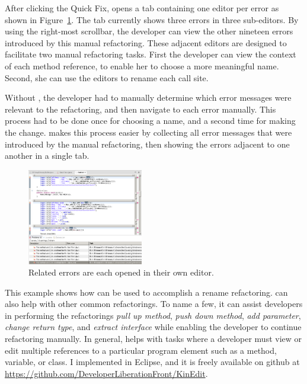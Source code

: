 \documentclass{sigplanconf}
\begin{document}
After clicking the Quick Fix, \pname{} opens a tab containing one editor
per error as shown in Figure~\ref{mult}. The tab currently shows three
errors in three sub-editors. By using the right-most scrollbar, the developer
can view the other nineteen errors introduced by this manual refactoring.
These adjacent editors are designed to facilitate two manual refactoring tasks.
First the developer can view the context of each method reference, to enable
her to choose a more meaningful name. Second, she can use
the editors to rename each call site.

Without \pname{}, the developer had to
manually determine which error messages were relevant to the refactoring, and
then navigate to each error manually. This process had to be done once for
choosing a name, and a second time for making the change. \pname{} makes this
process
easier by collecting all error messages that were introduced by
the manual refactoring, then showing the errors adjacent to one another in a
single tab.

\begin{figure}[h]
\begin{center}
\includegraphics[width=0.45\textwidth]{multiple-editors.png}
\caption{Related errors are each opened in their own editor.\label{mult}}
\end{center}
\end{figure}

This example shows how \pname{} can be used to accomplish a rename refactoring.
\pname{} can also help with other common refactorings.
To name a few, it can assist developers in performing the refactorings
\textit{pull up method}, \textit{push down method}, \textit{add parameter},
\textit{change return type}, and \textit{extract interface}
while enabling the developer to continue refactoring manually. In general,
\pname{} helps with tasks where a developer must view or edit multiple
references to a particular program element such as a method, variable, or
class.
I implemented \pname{} in Eclipse, and it is freely available on
github at \url{https://github.com/DeveloperLiberationFront/KinEdit}.
\end{document}

